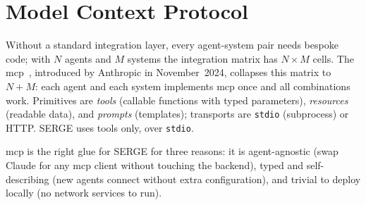 \section{Model Context Protocol}

Without a standard integration layer, every agent-system pair needs bespoke code; with $N$ agents and $M$ systems the integration matrix has $N \times M$ cells. The \gls{mcp}~\cite{mcp2024,mcpspec}, introduced by Anthropic in November~2024, collapses this matrix to $N + M$: each agent and each system implements \gls{mcp} once and all combinations work. Primitives are \emph{tools} (callable functions with typed parameters), \emph{resources} (readable data), and \emph{prompts} (templates); transports are \texttt{stdio} (subprocess) or HTTP. SERGE uses tools only, over \texttt{stdio}.

\gls{mcp} is the right glue for SERGE for three reasons: it is agent-agnostic (swap Claude for any \gls{mcp} client without touching the backend), typed and self-describing (new agents connect without extra configuration), and trivial to deploy locally (no network services to run).
